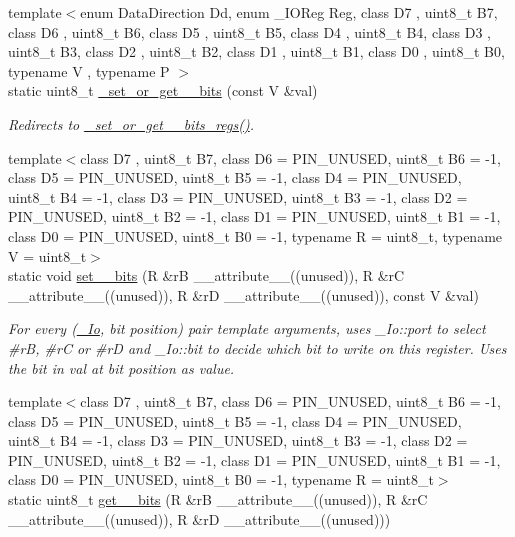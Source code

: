 \begin{DoxyCompactItemize}
{\footnotesize template$<$enum Data\+Direction Dd, enum \+\_\+\+I\+O\+Reg Reg, class D7 , uint8\+\_\+t B7, class D6 , uint8\+\_\+t B6, class D5 , uint8\+\_\+t B5, class D4 , uint8\+\_\+t B4, class D3 , uint8\+\_\+t B3, class D2 , uint8\+\_\+t B2, class D1 , uint8\+\_\+t B1, class D0 , uint8\+\_\+t B0, typename V , typename P $>$ }\\static uint8\+\_\+t \hyperlink{namespaceports_ada41109199590d9ccafae0f6d2adaf99}{\+\_\+set\+\_\+or\+\_\+get\+\_\+\_\+bits} (const V \&val)
\begin{DoxyCompactList}\small\item\em Redirects to \hyperlink{namespaceports_a49c5f4c094bbfe316f3d63897cd7f6a6}{\+\_\+set\+\_\+or\+\_\+get\+\_\+\_\+bits\+\_\+regs()}. \end{DoxyCompactList}\item 
{\footnotesize template$<$class D7 , uint8\+\_\+t B7, class D6  = P\+I\+N\+\_\+\+U\+N\+U\+S\+ED, uint8\+\_\+t B6 = -\/1, class D5  = P\+I\+N\+\_\+\+U\+N\+U\+S\+ED, uint8\+\_\+t B5 = -\/1, class D4  = P\+I\+N\+\_\+\+U\+N\+U\+S\+ED, uint8\+\_\+t B4 = -\/1, class D3  = P\+I\+N\+\_\+\+U\+N\+U\+S\+ED, uint8\+\_\+t B3 = -\/1, class D2  = P\+I\+N\+\_\+\+U\+N\+U\+S\+ED, uint8\+\_\+t B2 = -\/1, class D1  = P\+I\+N\+\_\+\+U\+N\+U\+S\+ED, uint8\+\_\+t B1 = -\/1, class D0  = P\+I\+N\+\_\+\+U\+N\+U\+S\+ED, uint8\+\_\+t B0 = -\/1, typename R  = uint8\+\_\+t, typename V  = uint8\+\_\+t$>$ }\\static void \hyperlink{namespaceports_aad48d351c7d83de929acb9e149663d41}{set\+\_\+\_\+bits} (R \&rB \+\_\+\+\_\+attribute\+\_\+\+\_\+((unused)), R \&rC \+\_\+\+\_\+attribute\+\_\+\+\_\+((unused)), R \&rD \+\_\+\+\_\+attribute\+\_\+\+\_\+((unused)), const V \&val)
\begin{DoxyCompactList}\small\item\em For every (\hyperlink{structports_1_1__Io}{\+\_\+\+Io}, \textquotesingle{}bit position\textquotesingle{}) pair template arguments, uses \+\_\+\+Io\+::port to select \#rB, \#rC or \#rD and \+\_\+\+Io\+::bit to decide which bit to write on this register. Uses the bit in val at \textquotesingle{}bit position\textquotesingle{} as value. \end{DoxyCompactList}\item 
{\footnotesize template$<$class D7 , uint8\+\_\+t B7, class D6  = P\+I\+N\+\_\+\+U\+N\+U\+S\+ED, uint8\+\_\+t B6 = -\/1, class D5  = P\+I\+N\+\_\+\+U\+N\+U\+S\+ED, uint8\+\_\+t B5 = -\/1, class D4  = P\+I\+N\+\_\+\+U\+N\+U\+S\+ED, uint8\+\_\+t B4 = -\/1, class D3  = P\+I\+N\+\_\+\+U\+N\+U\+S\+ED, uint8\+\_\+t B3 = -\/1, class D2  = P\+I\+N\+\_\+\+U\+N\+U\+S\+ED, uint8\+\_\+t B2 = -\/1, class D1  = P\+I\+N\+\_\+\+U\+N\+U\+S\+ED, uint8\+\_\+t B1 = -\/1, class D0  = P\+I\+N\+\_\+\+U\+N\+U\+S\+ED, uint8\+\_\+t B0 = -\/1, typename R  = uint8\+\_\+t$>$ }\\static uint8\+\_\+t \hyperlink{namespaceports_aa361d75af5b2f101c6304d1385c023ce}{get\+\_\+\_\+bits} (R \&rB \+\_\+\+\_\+attribute\+\_\+\+\_\+((unused)), R \&rC \+\_\+\+\_\+attribute\+\_\+\+\_\+((unused)), R \&rD \+\_\+\+\_\+attribute\+\_\+\+\_\+((unused)))

\end{DoxyCompactItemize}
